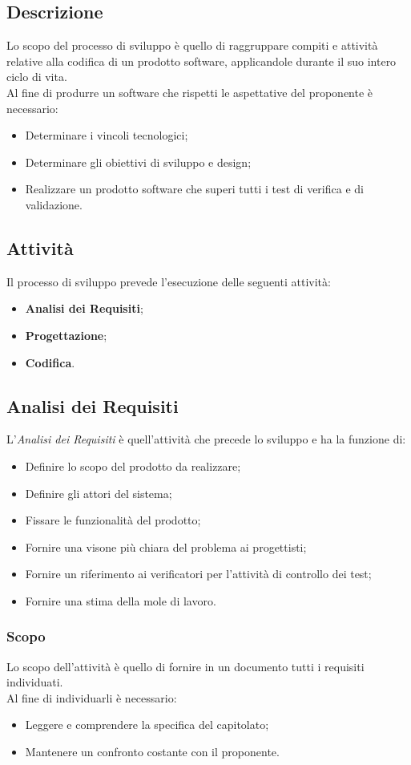 \subsection{Descrizione}
  Lo scopo del processo di sviluppo è quello di raggruppare compiti e attività relative alla codifica di un prodotto software, applicandole durante il suo intero ciclo di vita. \\
  Al fine di produrre un software che rispetti le aspettative del proponente è necessario:
  \begin{itemize}
    \item Determinare i vincoli tecnologici;
    \item Determinare gli obiettivi di sviluppo e design;
    \item Realizzare un prodotto software che superi tutti i test di verifica e di validazione.
  \end{itemize}
  \subsection{Attività}

  Il processo di sviluppo prevede l'esecuzione delle seguenti attività:
  \begin{itemize}
    \item \textbf{Analisi dei Requisiti};
    \item \textbf{Progettazione};
    \item \textbf{Codifica}.
  \end{itemize}
  \subsection{Analisi dei Requisiti}
    L'\textit{Analisi dei Requisiti} è quell'attività che precede lo sviluppo e ha la funzione di:
    \begin{itemize}
      \item Definire lo scopo del prodotto da realizzare;
      \item Definire gli attori del sistema;
      \item Fissare le funzionalità del prodotto;
      \item Fornire una visone più chiara del problema ai progettisti;
      \item Fornire un riferimento ai verificatori per l'attività di controllo dei test;
      \item Fornire una stima della mole di lavoro.
    \end{itemize}
    \subsubsection{Scopo}
    Lo scopo dell'attività è quello di fornire in un documento tutti i requisiti individuati.\\
    Al fine di individuarli è necessario:
    \begin{itemize}
      \item Leggere e comprendere la specifica del capitolato;
      \item Mantenere un confronto costante con il proponente.
    \end{itemize}
